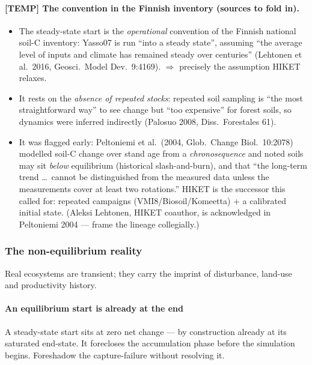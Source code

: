 \documentclass[11pt]{article}
\begin{document}
\paragraph{[TEMP] The convention in the Finnish inventory (sources to fold in).}
\begin{itemize}
\item The steady-state start is the \emph{operational} convention of the Finnish
  national soil-C inventory: Yasso07 is run ``into a steady state'', assuming
  ``the average level of inputs and climate has remained steady over centuries''
  (Lehtonen et al.\ 2016, Geosci.\ Model Dev.\ 9:4169). $\Rightarrow$ precisely the
  assumption HIKET relaxes.
\item It rests on the \emph{absence of repeated stocks}: repeated soil sampling is
  ``the most straightforward way'' to see change but ``too expensive'' for forest
  soils, so dynamics were inferred indirectly (Palosuo 2008, Diss.\ Forestales 61).
\item It was flagged early: Peltoniemi et al.\ (2004, Glob.\ Change Biol.\ 10:2078)
  modelled soil-C change over stand age from a \emph{chronosequence} and noted soils
  may sit \emph{below} equilibrium (historical slash-and-burn), and that ``the
  long-term trend \dots\ cannot be distinguished from the measured data unless the
  measurements cover at least two rotations.'' HIKET is the successor this called
  for: repeated campaigns (VMI8/Biosoil/Komeetta) + a calibrated initial state.
  (Aleksi Lehtonen, HIKET coauthor, is acknowledged in Peltoniemi 2004 — frame the
  lineage collegially.)
\end{itemize}

\subsubsection{The non-equilibrium reality}
Real ecosystems are transient; they carry the imprint of disturbance,
land-use and productivity history.

\paragraph{An equilibrium start is already at the end}
A steady-state start sits at zero net change --- by construction already at
its saturated end-state. It forecloses the accumulation phase before the
simulation begins. Foreshadow the capture-failure without resolving it.
\end{document}
